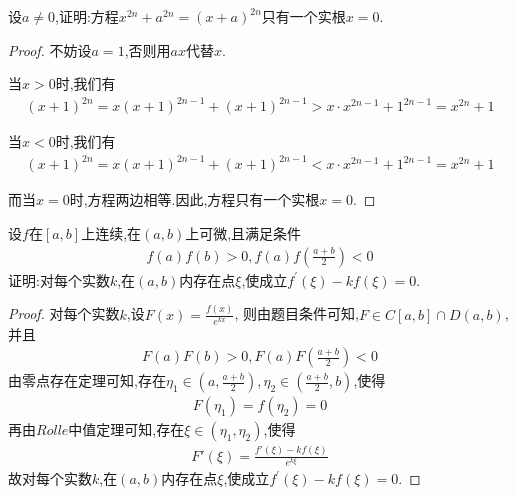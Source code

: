 \documentclass[lang=cn,newtx,10pt,scheme=chinese]{elegantbook}
\begin{document}
\begin{exercise}
设\(a\neq0\),证明:方程\(x^{2n}+a^{2n}=(x + a)^{2n}\)只有一个实根\(x = 0\).
\end{exercise}    
\begin{proof}
        不妨设$a=1$,否则用$ax$代替$x$.

        当$x>0$时,我们有
        \begin{gather}
            (x+1)^{2n}=x(x+1)^{2n-1}+(x+1)^{2n-1}>x\cdot x^{2n-1}+1^{2n-1}=x^{2n}+1
            \nonumber
        \end{gather}

        当$x<0$时,我们有
        \begin{gather}
            (x+1)^{2n}=x(x+1)^{2n-1}+(x+1)^{2n-1}<x\cdot x^{2n-1}+1^{2n-1}=x^{2n}+1
            \nonumber
        \end{gather}

        而当$x=0$时,方程两边相等.因此,方程只有一个实根$x=0$.
\end{proof}


\begin{exercise}
    设\(f\)在\([a,b]\)上连续,在\((a,b)\)上可微,且满足条件
    \begin{gather}
        f(a)f(b)>0,f(a)f\left(\frac{a + b}{2}\right)<0
        \nonumber
    \end{gather}
    证明:对每个实数\(k\),在\((a,b)\)内存在点\(\xi\),使成立\(f^{\prime}(\xi)-kf(\xi)=0\).
\end{exercise}
\begin{proof}
        对每个实数$k$,设$F\left( x \right) =\frac{f\left( x \right)}{e^{kx}}$,
        则由题目条件可知,$F\in C\left[ a,b \right] \cap D\left( a,b \right)$,并且
        \begin{gather}
            F\left( a \right) F\left( b \right) >0,F\left( a \right) F\left( \frac{a+b}{2} \right) <0
            \nonumber
        \end{gather}
        由零点存在定理可知,存在$\eta_1\in(a,\frac{a+b}{2}),\eta_2\in(\frac{a+b}{2},b)$,使得
        \begin{gather}
            F(\eta_1)=f(\eta_2)=0
            \nonumber
        \end{gather}
        再由$Rolle$中值定理可知,存在$\xi\in(\eta_1,\eta_2)$,使得
        \begin{gather}
            F'\left( \xi \right) =\frac{f'\left( \xi \right) -kf\left( \xi \right)}{e^{k\xi}}
            \nonumber
        \end{gather}
        故对每个实数\(k\),在\((a,b)\)内存在点\(\xi\),使成立\(f^{\prime}(\xi)-kf(\xi)=0\).
\end{proof}
\end{document}

